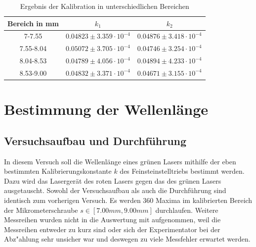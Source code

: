 \documentclass[12pt,a4paper]{article}
\begin{document}
\begin{table}[H]
	\centering
	\begin{tabular}{|c|c|c|}
		\hline 
		Bereich in mm&$k_1$&$k_2$  \\ 
		\hline 
		7-7.55 &$0.04823\pm3.359 \cdot 10^{-4}$ &$0.04876\pm3.418 \cdot 10^{-4}$  \\ 
		\hline 
		7.55-8.04&$0.05072\pm3.705 \cdot 10^{-4}$ &$0.04746\pm3.254 \cdot 10^{-4}$ \\ 
		\hline 
		8.04-8.53&$0.04789\pm4.056 \cdot 10^{-4}$ &$0.04894\pm4.233 \cdot 10^{-4}$ \\ 
		\hline 
		8.53-9.00&$0.04832\pm3.371 \cdot 10^{-4}$ &$0.04671\pm3.155 \cdot 10^{-4}$ \\ 
		\hline 
	\end{tabular} 
	\caption{Ergebnis der Kalibration in unterschiedlichen Bereichen}
	\label{table:kalib}
\end{table} 

\section{Bestimmung der Wellenlänge}
\subsection{Versuchsaufbau und Durchführung}
In diesem Versuch soll die Wellenlänge eines grünen Lasers mithilfe der eben bestimmten Kalibrierungskonstante $k$ des Feinsteinstelltriebs bestimmt werden. Dazu wird das Lasergerät des roten Lasers gegen das des grünen Lasers ausgetauscht. Sowohl der Versuchsaufbau als auch die Durchführung sind identisch zum vorherigen Versuch. Es werden 360 Maxima im kalibrierten Bereich der Mikrometerschraube $s\in[7.00mm,9.00mm]$ durchlaufen.
Weitere Messreihen wurden nicht in die Auswertung mit aufgenommen, weil die Messreihen entweder zu kurz sind oder sich der Experimentator bei der Abz"ahlung sehr unsicher war und deswegen zu viele Messfehler erwartet werden.
\end{document}
